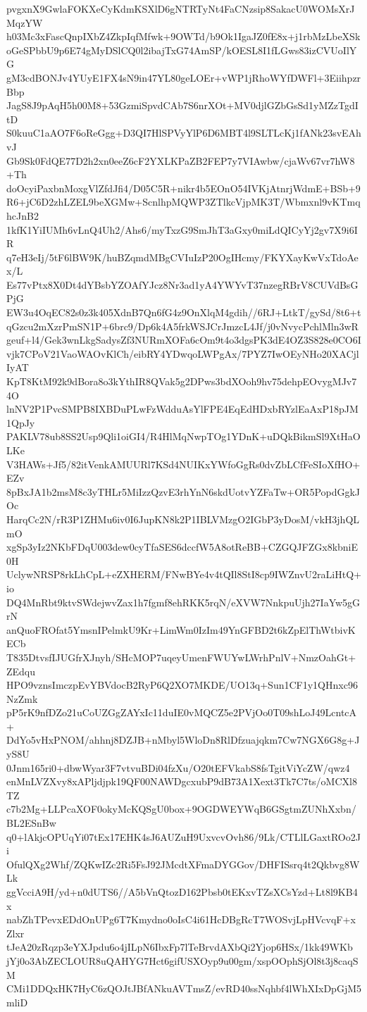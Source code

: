 pvgxnX9GwlaFOKXeCyKdmKSXlD6gNTRTyNt4FaCNzsip8SakacU0WOMsXrJMqzYW
h03Mc3xFascQnpIXbZ4ZkpIqfMfwk+9OWTd/b9Ok1IgaJZ0fE8x+j1rbMzLbeXSk
oGeSPbbU9p6E74gMyDSlCQ0l2ibajTxG74AmSP/kOESL8I1fLGws83izCVUoIlYG
gM3cdBONJv4YUyE1FX4sN9in47YL80geLOEr+vWP1jRhoWYfDWFl+3EiihpzrBbp
JagS8J9pAqH5h00M8+53GzmiSpvdCAb7S6nrXOt+MV0djlGZbGsSd1yMZzTgdItD
S0kuuC1aAO7F6oReGgg+D3QI7HlSPVyYlP6D6MBT4l9SLTLcKj1fANk23svEAhvJ
Gb9Sk0FdQE77D2h2xn0eeZ6cF2YXLKPaZB2FEP7y7VIAwbw/cjaWv67vr7hW8+Th
doOcyiPaxbnMoxgVlZfdJfi4/D05C5R+nikr4b5EOnO54IVKjAtnrjWdmE+BSb+9
R6+jC6D2zhLZEL9beXGMw+ScnlhpMQWP3ZTlkcVjpMK3T/Wbmxnl9vKTmqhcJnB2
1kfK1YiIUMh6vLnQ4Uh2/Ahs6/myTxzG9SmJhT3aGxy0miLdQICyYj2gv7X9i6IR
q7eH3eIj/5tF6lBW9K/huBZqmdMBgCVIuIzP20OgIHcmy/FKYXayKwVxTdoAex/L
Es77vPtx8X0Dt4dYBsbYZOAfYJcz8Nr3ad1yA4YWYvT37nzegRBrV8CUVdBsGPjG
EW3u4OqEC82s0z3k405XdnB7Qn6fG4z9OnXlqM4gdih//6RJ+LtkT/gySd/8t6+t
qGzcu2mXzrPmSN1P+6brc9/Dp6k4A5frkWSJCrJmzcL4Jf/j0vNvycPchlMln3wR
geuf+l4/Gek3wnLkgSadysZf3NURmXOFa6cOm9t4o3dgsPK3dE4OZ3S828e0CO6I
vjk7CPoV21VaoWAOvKlCh/eibRY4YDwqoLWPgAx/7PYZ7IwOEyNHo20XACjlIyAT
KpT8KtM92k9dBora8o3kYthIR8QVak5g2DPws3bdXOoh9hv75dehpEOvygMJv74O
lnNV2P1PvcSMPB8IXBDuPLwFzWdduAsYlFPE4EqEdHDxbRYzlEaAxP18pJM1QpJy
PAKLV78ub8SS2Usp9Qli1oiGI4/R4HlMqNwpTOg1YDnK+uDQkBikmSl9XtHaOLKe
V3HAWs+Jf5/82itVenkAMUURl7KSd4NUIKxYWfoGgRs0dvZbLCfFeSIoXfHO+EZv
8pBxJA1b2msM8c3yTHLr5MiIzzQzvE3rhYnN6skdUotvYZFaTw+OR5PopdGgkJOc
HarqCc2N/rR3P1ZHMu6iv0I6JupKN8k2P1IBLVMzgO2IGbP3yDosM/vkH3jhQLmO
xgSp3yIz2NKbFDqU003dew0cyTfaSES6dccfW5A8otReBB+CZGQJFZGx8kbniE0H
UclywNRSP8rkLhCpL+eZXHERM/FNwBYe4v4tQIl8StI8cp9IWZnvU2raLiHtQ+io
DQ4MnRbt9ktvSWdejwvZax1h7fgmf8ehRKK5rqN/eXVW7NnkpuUjh27IaYw5gGrN
anQuoFROfat5YmsnIPelmkU9Kr+LimWm0IzIm49YnGFBD2t6kZpElThWtbivKECb
T835DtvsfIJUGfrXJnyh/SHcMOP7uqeyUmenFWUYwLWrhPnlV+NmzOahGt+ZEdqu
HPO9vznsImczpEvYBVdocB2RyP6Q2XO7MKDE/UO13q+Sun1CF1y1QHnxc96NzZmk
pP5rK9nfDZo21uCoUZGgZAYxIc11duIE0vMQCZ5e2PVjOo0T09shLoJ49LcntcA+
DdYo5vHxPNOM/ahhnj8DZJB+nMbyl5WloDn8RlDfzuajqkm7Cw7NGX6G8g+JyS8U
0Jnm165ri0+dbwWyar3F7vtvuBDi04fzXu/O20tEFVkabS8fsTgitViYcZW/qwz4
enMnLVZXvy8xAPljdjpk19QF00NAWDgcxubP9dB73A1Xext3Tk7C7ts/oMCXl8TZ
c7b2Mg+LLPcaXOF0okyMcKQSgU0box+9OGDWEYWqB6GSgtmZUNhXxbn/BL2ESnBw
q0+lAkjcOPUqYi07tEx17EHK4sJ6AUZuH9UxvcvOvh86/9Lk/CTLlLGaxtROo2Ji
OfulQXg2Whf/ZQKwIZc2Ri5FsJ92JMcdtXFmaDYGGov/DHFISsrq4t2Qkbvg8WLk
ggVcciA9H/yd+n0dUTS6//A5bVnQtozD162Pbsb0tEKxvTZsXCsYzd+Lt8l9KB4x
nabZhTPevxEDdOnUPg6T7Kmydno0oIsC4i61HcDBgRcT7WOSvjLpHVcvqF+xZlxr
tJeA20zRqzp3eYXJpdu6o4jILpN6IbxFp7lTeBrvdAXbQi2Yjop6HSx/1kk49WKb
jYj0o3AbZECLOUR8uQAHYG7Hct6gifUSXOyp9u00gm/xspOOphSjOl8t3j8caqSM
CMi1DDQxHK7HyC6zQOJtJBfANkuAVTmsZ/evRD40ssNqhbf4lWhXIxDpGjM5mliD
